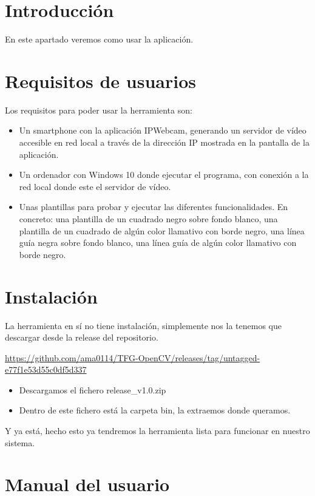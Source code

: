 
\section{Introducción}
En este apartado veremos como usar la aplicación.

\section{Requisitos de usuarios}
Los requisitos para poder usar la herramienta son:
\begin{itemize}
	\item Un smartphone con la aplicación IPWebcam, generando un servidor de vídeo accesible en red local a través de la dirección IP mostrada en la pantalla de la aplicación.
	
	\item Un ordenador con Windows 10 donde ejecutar el programa, con conexión a la red local donde este el servidor de vídeo.
	
	\item Unas plantillas para probar y ejecutar las diferentes funcionalidades. En concreto: una plantilla de un cuadrado negro sobre fondo blanco, una plantilla de un cuadrado de algún color llamativo con borde negro, una línea guía negra sobre fondo blanco, una línea guía de algún color llamativo con borde negro.
	
\end{itemize}

\section{Instalación}
La herramienta en sí no tiene instalación, simplemente nos la tenemos que descargar desde la release del repositorio.

\url{https://github.com/ama0114/TFG-OpenCV/releases/tag/untagged-e77f1e53d55c0df5d337}

\begin{itemize}
	\item Descargamos el fichero release\_v1.0.zip
	\item Dentro de este fichero está la carpeta bin, la extraemos donde queramos.
\end{itemize}

Y ya está, hecho esto ya tendremos la herramienta lista para funcionar en nuestro sistema.

\section{Manual del usuario}


